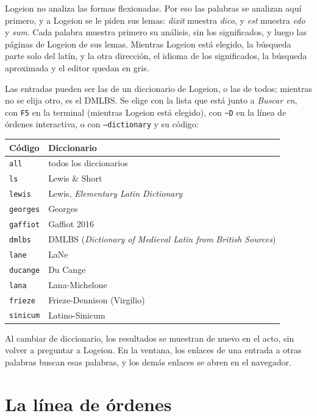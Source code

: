 \documentclass[12pt,
              article,
              oneside
              ]{memoir}
\newcommand*{\menu}[1]{\textit{#1}}
\newcommand*{\key}[1]{\texttt{#1}}
\newcommand*{\tl}{\textasciitilde}
\begin{document}
%
Logeion no analiza las formas flexionadas. Por eso las palabras se
analizan aquí primero, y a Logeion se le piden sus lemas: \textit{dixit}
muestra \textit{dico}, y \textit{est} muestra \textit{edo} y \textit{sum}.
Cada palabra muestra primero su análisis, sin los significados, y luego
las páginas de Logeion de sus lemas. Mientras Logeion está elegido, la
búsqueda parte solo del latín, y la otra dirección, el idioma de los
significados, la búsqueda aproximada y el editor quedan en gris.

%
Las entradas pueden ser las de un diccionario de Logeion, o las de todos;
mientras no se elija otro, es el DMLBS. Se elige con la lista que está
junto a \menu{Buscar en}, con \key{F5} en la terminal (mientras Logeion
está elegido), con \texttt{\tl D} en la línea de órdenes interactiva, o
con \texttt{--dictionary} y su código:

\begin{longtable}{@{}lp{}@{}}
\toprule
Código & Diccionario\\
\midrule
\endhead
\texttt{all} & todos los diccionarios\\
\texttt{ls} & Lewis \& Short\\
\texttt{lewis} & Lewis, \textit{Elementary Latin Dictionary}\\
\texttt{georges} & Georges\\
\texttt{gaffiot} & Gaffiot 2016\\
\texttt{dmlbs} & DMLBS (\textit{Dictionary of Medieval Latin from British Sources})\\
\texttt{lane} & LaNe\\
\texttt{ducange} & Du Cange\\
\texttt{lana} & Lana-Michelone\\
\texttt{frieze} & Frieze-Dennison (Virgilio)\\
\texttt{sinicum} & Latino-Sinicum\\
\bottomrule
\end{longtable}

\noindent
Al cambiar de diccionario, los resultados se muestran de nuevo en el
acto, sin volver a preguntar a Logeion. En la ventana, los enlaces de una
entrada a otras palabras buscan esas palabras, y los demás enlaces se
abren en el navegador.

\section{La línea de órdenes}
\label{sec:cli}
\end{document}
